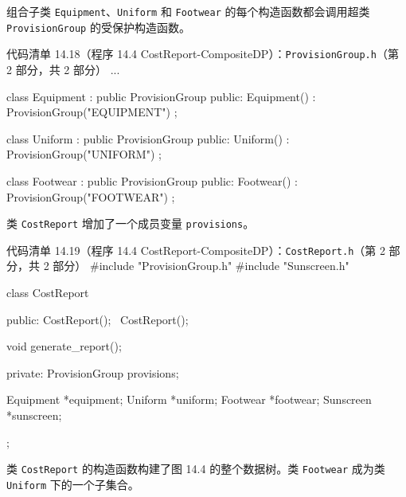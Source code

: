 \par
{}\par
{}\par

组合子类 \texttt{Equipment}、\texttt{Uniform} 和 \texttt{Footwear} 的每个构造函数都会调用超类 \texttt{Provision\allowbreak{}Group} 的受保护构造函数。

\begin{codeboxt}{代码清单 14.18（程序 14.4 CostReport-CompositeDP）：\texttt{Provision\allowbreak{}Group.\allowbreak{}h}（第 2 部分，共 2 部分）}
...

class Equipment : public ProvisionGroup
{
public:
    Equipment() : ProvisionGroup("EQUIPMENT") {}
};

class Uniform : public ProvisionGroup
{
public:
    Uniform() : ProvisionGroup("UNIFORM") {}
};

class Footwear : public ProvisionGroup
{
public:
    Footwear() : ProvisionGroup("FOOTWEAR") {}
};
\end{codeboxt}

类 \texttt{Cost\allowbreak{}Report} 增加了一个成员变量 \texttt{provisions}。

\begin{codeboxt}{代码清单 14.19（程序 14.4 CostReport-CompositeDP）：\texttt{Cost\allowbreak{}Report.\allowbreak{}h}（第 2 部分，共 2 部分）}
#include "ProvisionGroup.h"
#include "Sunscreen.h"

class CostReport
{
public:
    CostReport();
    ~CostReport();

    void generate_report();

private:
    ProvisionGroup provisions;

    Equipment *equipment;
    Uniform   *uniform;
    Footwear  *footwear;
    Sunscreen *sunscreen;
};
\end{codeboxt}

类 \texttt{Cost\allowbreak{}Report} 的构造函数构建了图 14.4 的整个数据树。类 \texttt{Footwear} 成为类 \texttt{Uniform} 下的一个子集合。


